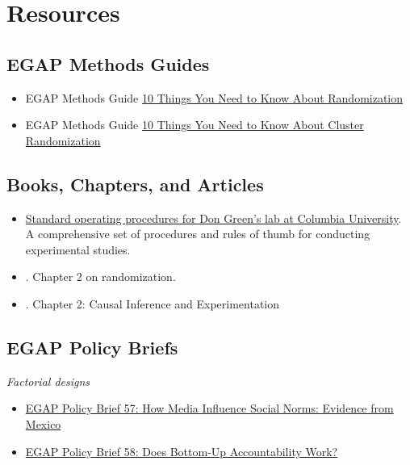 \documentclass[12pt,]{book}
\begin{document}
\hypertarget{resources-2}{%
\section{Resources}\label{resources-2}}

\hypertarget{egap-methods-guides-2}{%
\subsection{EGAP Methods Guides}\label{egap-methods-guides-2}}

\begin{itemize}
\item
  EGAP Methods Guide \href{https://egap.org/resource/10-things-you-need-know-randomization}{10 Things You Need to Know About Randomization}
\item
  EGAP Methods Guide \href{http://egap.org/resource/10-things-you-need-know-about-cluster-randomization}{10 Things You Need to Know About Cluster Randomization}
\end{itemize}

\hypertarget{books-chapters-and-articles-1}{%
\subsection{Books, Chapters, and Articles}\label{books-chapters-and-articles-1}}

\begin{itemize}
\item
  \href{https://github.com/acoppock/Green-Lab-SOP}{Standard operating procedures for Don Green's lab at Columbia University}. A comprehensive set of procedures and rules of thumb for conducting experimental studies.
\item
  \autocite{glennerster_running_2013}. Chapter 2 on randomization.
\item
  \autocite{gerber_field_2012}. Chapter 2: Causal Inference and Experimentation
\end{itemize}

\hypertarget{egap-policy-briefs-1}{%
\subsection{EGAP Policy Briefs}\label{egap-policy-briefs-1}}

\emph{Factorial designs}

\begin{itemize}
\item
  \href{https://egap.org/resource/how-media-influence-social-norms-evidence-from-mexico/}{EGAP Policy Brief 57: How Media Influence Social Norms: Evidence from Mexico}
\item
  \href{https://egap.org/resource/does-bottom-up-accountability-work-evidence-from-uganda/}{EGAP Policy Brief 58: Does Bottom-Up Accountability Work?}
\end{itemize}
\end{document}
